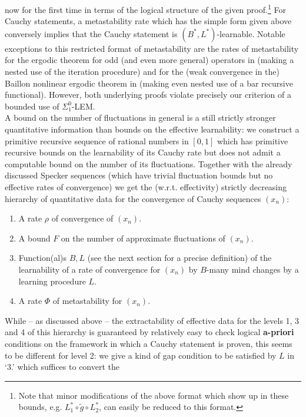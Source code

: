 \documentclass[1p]{elsarticle}
\theoremstyle{plain}
\theoremstyle{definition}
\theoremstyle{remark}
\theoremstyle{definition}
\begin{document}
now for the first time in terms of the logical structure of the given 
proof.\footnote{Note that minor modifications of the above format which show 
up in these bounds, e.g. $L^*_1\circ \tilde{g}\circ L^*_2$, 
can easily be reduced 
to this format.} For Cauchy statements, a metastability rate which has 
the simple form given above conversely implies that the Cauchy statement is 
$(B^*,L^*)$-learnable. 
Notable exceptions to this restricted format of metastability are the rates 
of metastability for 
the ergodic theorem for odd (and even more general) operators in 
\cite{Safarik(11)} (making a nested use of the iteration procedure) and 
for the (weak convergence in the) Baillon nonlinear ergodic theorem 
in \cite{Kohlenbach(Baillon)} (making even nested use of a bar recursive 
functional). However, both underlying proofs 
violate precisely our criterion of a bounded use of $\Sigma^0_1$-LEM.  
\\[2mm]
A bound on the number of fluctuations in general is a still  
strictly stronger quantitative information than bounds on the effective 
learnability: we construct a primitive recursive sequence of rational 
numbers in $[0,1]$ which 
has primitive recursive bounds on the learnability of its Cauchy rate 
but does not admit a computable bound on the number of its fluctuations.
Together with the already discussed Specker sequences (which have 
trivial fluctuation bounds but no effective rates of convergence) 
we get the (w.r.t. effectivity) strictly decreasing hierarchy of 
quantitative data for the convergence of Cauchy sequences $(x_n)$:
\begin{enumerate}
\item 
A rate $\rho$ of convergence of $(x_n).$
\item 
A bound $F$ on the number of approximate fluctuations of $(x_n).$
\item 
Function(al)s $B,L$ (see the next section for a precise definition) 
of the learnability of a rate of convergence for $(x_n)$ by 
$B$-many mind changes by a learning procedure $L.$
\item 
A rate $\Phi$ of metastability for $(x_n).$
\end{enumerate}   
While -- as discussed above -- the extractability of effective data 
for the levels 1, 3 and 4 of this hierarchy is guaranteed by 
relatively easy to check logical {\bf a-priori}  
conditions on the framework in which a Cauchy statement is proven, 
this seems to be different for level 2: we give a kind of gap condition 
to be satisfied by $L$ in `3.' which suffices to convert the 
\end{document}
